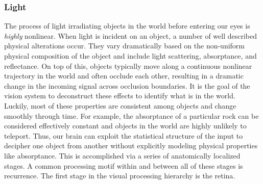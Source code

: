 \subsubsection{Light}
The process of light irradiating objects in the world before entering our eyes is \textit{highly} nonlinear. When light is incident on an object, a number of well described physical alterations occur. They vary dramatically based on the non-uniform physical composition of the object and include light scattering, absorptance, and reflectance. On top of this, objects typically move along a continuous nonlinear trajectory in the world and often occlude each other, resulting in a dramatic change in the incoming signal across occlusion boundaries. It is the goal of the vision system to deconstruct these effects to identify what is in the world. Luckily, most of these properties are consistent among objects and change smoothly through time. For example, the absorptance of a particular rock can be considered effectively constant and objects in the world are highly unlikely to teleport. Thus, our brain can exploit the statistical structure of the input to decipher one object from another without explicitly modeling physical properties like absorptance. This is accomplished via a series of anatomically localized stages. A common processing motif within and between all of these stages is recurrence. The first stage in the visual processing hierarchy is the retina.


